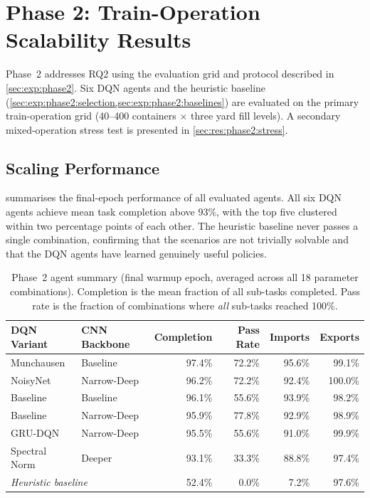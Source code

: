 \section{Phase 2: Train-Operation Scalability Results}
\label{sec:res:phase2}

Phase~2 addresses RQ2 using the evaluation grid and protocol described in \cref{sec:exp:phase2}.  Six DQN agents and the heuristic baseline (\cref{sec:exp:phase2:selection,sec:exp:phase2:baselines}) are evaluated on the primary train-operation grid (40--400 containers $\times$ three yard fill levels).  A secondary mixed-operation stress test is presented in \cref{sec:res:phase2:stress}.

\subsection{Scaling Performance}
\label{sec:res:phase2:scaling}

 summarises the final-epoch performance of all evaluated agents.  All six DQN agents achieve mean task completion above 93\%, with the top five clustered within two percentage points of each other.  The heuristic baseline never passes a single combination, confirming that the scenarios are not trivially solvable and that the DQN agents have learned genuinely useful policies.

\begin{table}[H]
  \centering
  \caption{Phase~2 agent summary (final warmup epoch, averaged across all 18 parameter combinations).  Completion is the mean fraction of all sub-tasks completed.  Pass rate is the fraction of combinations where \emph{all} sub-tasks reached 100\%.}
  \label{tab:res:phase2_summary}
  \begin{tabular}{@{} l l r r r r @{}}
    \toprule
    \textbf{DQN Variant} & \textbf{CNN Backbone} & \textbf{Completion} & \textbf{Pass Rate} & \textbf{Imports} & \textbf{Exports} \\
    \midrule
    Munchausen     & Baseline    & 97.4\% & 72.2\% & 95.6\% & 99.1\%  \\
    NoisyNet       & Narrow-Deep & 96.2\% & 72.2\% & 92.4\% & 100.0\% \\
    Baseline       & Baseline    & 96.1\% & 55.6\% & 93.9\% & 98.2\%  \\
    Baseline       & Narrow-Deep & 95.9\% & 77.8\% & 92.9\% & 98.9\%  \\
    GRU-DQN        & Narrow-Deep & 95.5\% & 55.6\% & 91.0\% & 99.9\%  \\
    Spectral Norm  & Deeper      & 93.1\% & 33.3\% & 88.8\% & 97.4\%  \\
    \midrule
    \multicolumn{2}{l}{\textit{Heuristic baseline}} & 52.4\% & 0.0\%  & 7.2\%  & 97.6\% \\
    \bottomrule
  \end{tabular}
\end{table}

